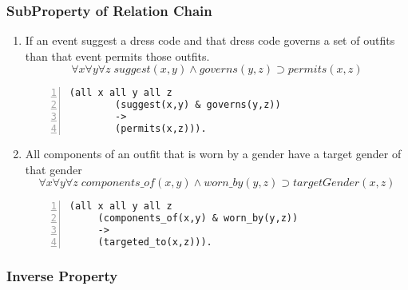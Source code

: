 \documentclass[paper=a4, fontsize=11pt]{scrartcl} %
\numberwithin{equation}{section} %
\numberwithin{figure}{section} %
\numberwithin{table}{section} %
\begin{document}
\subsubsection{SubProperty of Relation Chain}
\begin{enumerate}
	
	\item If an event suggest a dress code and that dress code governs a set of outfits than that event permits those outfits.
	\begin{equation*}
		\forall x \forall y \forall z \; suggest(x,y) \land governs(y,z) \supset permits(x,z)
	\end{equation*}
	\begin{Verbatim}[frame=lines,gobble=2,numbers=left]
		(all x all y all z 
		(suggest(x,y) & governs(y,z))
		->
		(permits(x,z))).
	\end{Verbatim}

	
	\item All components of an outfit that is worn by a gender have a target gender of that gender 
	\begin{equation*}
		\forall x \forall y \forall z \; components\_of(x,y) \land worn\_by(y,z) \supset targetGender(x,z)
	\end{equation*}
	\begin{Verbatim}[frame=lines,gobble=2,numbers=left]
	 (all x all y all z 
	 (components_of(x,y) & worn_by(y,z))
	 ->
	 (targeted_to(x,z))). 
	\end{Verbatim}
	
	\end{enumerate}

\subsubsection{Inverse Property}
\end{document}
